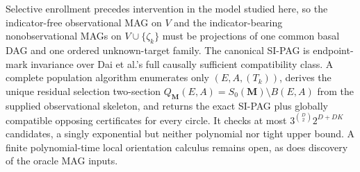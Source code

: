 Selective enrollment precedes intervention in the model studied here, so the indicator-free observational MAG on \(V\) and the indicator-bearing nonobservational MAGs on \(V\cup\{\zeta_k\}\) must be projections of one common basal DAG and one ordered unknown-target family.  The canonical SI-PAG is endpoint-mark invariance over Dai et al.'s full causally sufficient compatibility class.  A complete population algorithm enumerates only \((E,A,(T_k))\), derives the unique residual selection two-section \(Q_{\mathbf M}(E,A)=S_0(\mathbf M)\setminus B(E,A)\) from the supplied observational skeleton, and returns the exact SI-PAG plus globally compatible opposing certificates for every circle.  It checks at most \(3^{\binom D2}2^{D+DK}\) candidates, a singly exponential but neither polynomial nor tight upper bound.  A finite polynomial-time local orientation calculus remains open, as does discovery of the oracle MAG inputs.